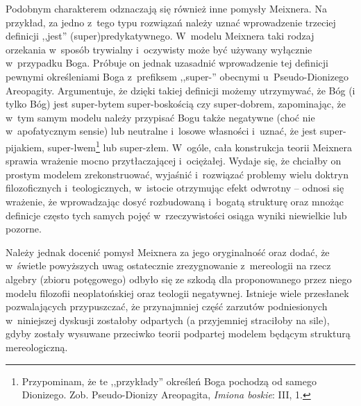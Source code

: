 Podobnym charakterem odznaczają się również inne pomysły Meixnera. Na przykład, za jedno z~tego typu rozwiązań należy uznać wprowadzenie trzeciej definicji ,,jest'' (super)predykatywnego. W~modelu Meixnera taki rodzaj orzekania w~sposób trywialny i~oczywisty może być używany wyłącznie w~przypadku Boga. Próbuje on jednak uzasadnić wprowadzenie tej definicji pewnymi określeniami Boga z~prefiksem ,,super-'' obecnymi u~Pseudo-Dionizego Areopagity. Argumentuje, że dzięki takiej definicji możemy utrzymywać, że Bóg (i tylko Bóg) jest super-bytem super-boskością czy super-dobrem, zapominając, że w~tym samym modelu należy przypisać Bogu także negatywne (choć nie w~apofatycznym sensie) lub neutralne i~losowe własności i~uznać, że jest super-pijakiem, super-lwem\footnote{ Przypominam, że te ,,przykłady'' określeń Boga pochodzą od samego Dionizego. Zob. Pseudo-Dionizy Areopagita, \textit{Imiona boskie}: III, 1.} lub super-złem. W~ogóle, cała konstrukcja teorii Meixnera sprawia wrażenie mocno przytłaczającej i~ociężałej. Wydaje się, że chciałby on prostym modelem zrekonstruować, wyjaśnić i~rozwiązać problemy wielu doktryn filozoficznych i~teologicznych, w~istocie otrzymując efekt odwrotny -- odnosi się wrażenie, że wprowadzając dosyć rozbudowaną i~bogatą strukturę oraz mnożąc definicje często tych samych pojęć w~rzeczywistości osiąga wyniki niewielkie lub pozorne.

Należy jednak docenić pomysł Meixnera za jego oryginalność oraz dodać, że w~świetle powyższych uwag ostatecznie zrezygnowanie z~mereologii na rzecz algebry (zbioru potęgowego) odbyło się ze szkodą dla proponowanego przez niego modelu filozofii neoplatońskiej oraz teologii negatywnej. Istnieje wiele przesłanek pozwalających przypuszczać, że przynajmniej część zarzutów podniesionych w~niniejszej dyskusji zostałoby odpartych (a przyjemniej straciłoby na sile), gdyby zostały wysuwane przeciwko teorii podpartej modelem będącym strukturą mereologiczną.


